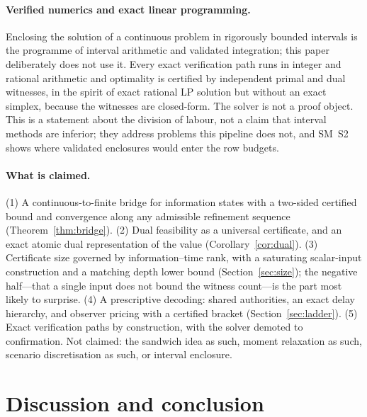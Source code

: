 \documentclass[11pt,a4paper]{article}
\theoremstyle{plain}
\theoremstyle{definition}
\theoremstyle{remark}
\begin{document}
\paragraph{Verified numerics and exact linear programming.}
Enclosing the solution of a continuous problem in rigorously bounded intervals is the programme of interval arithmetic and validated integration; this paper deliberately does not use it. Every exact verification path runs in integer and rational arithmetic and optimality is certified by independent primal and dual witnesses, in the spirit of exact rational LP solution \cite{Applegate2007} but without an exact simplex, because the witnesses are closed-form. The solver is not a proof object. This is a statement about the division of labour, not a claim that interval methods are inferior; they address problems this pipeline does not, and SM~S2 shows where validated enclosures would enter the row budgets.

\paragraph{What is claimed.}
(1) A continuous-to-finite bridge for information states with a two-sided certified bound and convergence along any admissible refinement sequence (Theorem~\ref{thm:bridge}). (2) Dual feasibility as a universal certificate, and an exact atomic dual representation of the value (Corollary~\ref{cor:dual}). (3) Certificate size governed by information--time rank, with a saturating scalar-input construction and a matching depth lower bound (Section~\ref{sec:size}); the negative half---that a single input does not bound the witness count---is the part most likely to surprise. (4) A prescriptive decoding: shared authorities, an exact delay hierarchy, and observer pricing with a certified bracket (Section~\ref{sec:ladder}). (5) Exact verification paths by construction, with the solver demoted to confirmation. Not claimed: the sandwich idea as such, moment relaxation as such, scenario discretisation as such, or interval enclosure.
\section{Discussion and conclusion}\label{sec:discussion}
\end{document}
